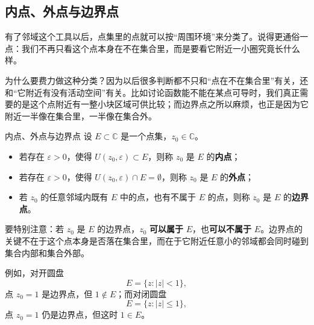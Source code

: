 \subsection{内点、外点与边界点}

有了邻域这个工具以后，点集里的点就可以按``周围环境''来分类了。说得更通俗一点：我们不再只看这个点本身在不在集合里，而是要看它附近一小圈究竟长什么样。

为什么要费力做这种分类？因为以后很多判断都不只和``点在不在集合里''有关，还和``它附近有没有活动空间''有关。比如讨论函数能不能在某点可导时，我们真正需要的是这个点附近有一整小块区域可供比较；而边界点之所以麻烦，也正是因为它附近一半像在集合里，一半像在集合外。

\begin{dingliyi}{内点、外点与边界点}{}
设 $E\subset\mathbb{C}$ 是一个点集，$z_0\in\mathbb{C}$。
\begin{itemize}
    \item 若存在 $\varepsilon>0$，使得 $U(z_0,\varepsilon)\subset E$，则称 $z_0$ 是 $E$ 的\textbf{内点}；
    \item 若存在 $\varepsilon>0$，使得 $U(z_0,\varepsilon)\cap E=\emptyset$，则称 $z_0$ 是 $E$ 的\textbf{外点}；
    \item 若 $z_0$ 的任意邻域内既有 $E$ 中的点，也有不属于 $E$ 的点，则称 $z_0$ 是 $E$ 的\textbf{边界点}。
\end{itemize}
\end{dingliyi}

\begin{zhu}{}{}
要特别注意：若 $z_0$ 是 $E$ 的边界点，$z_0$ \textbf{可以属于} $E$，也\textbf{可以不属于} $E$。边界点的关键不在于这个点本身是否落在集合里，而在于它附近任意小的邻域都会同时碰到集合内部和集合外部。

例如，对开圆盘
\[
    E=\{z:|z|<1\},
\]
点 $z_0=1$ 是边界点，但 $1\notin E$；而对闭圆盘
\[
    E=\{z:|z|\le 1\},
\]
点 $z_0=1$ 仍是边界点，但这时 $1\in E$。
\end{zhu}

